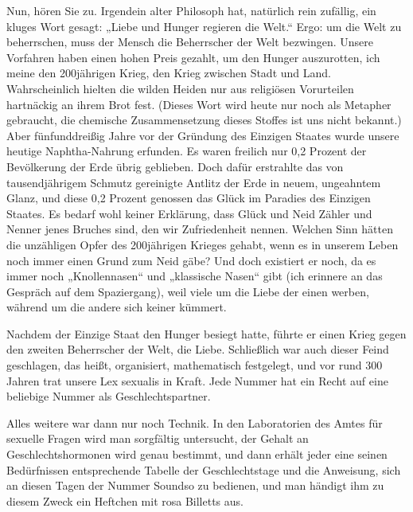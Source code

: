 Nun, hören Sie zu. Irgendein alter Philosoph hat, natürlich rein
zufällig, ein kluges Wort gesagt: „Liebe und Hunger regieren die
Welt.“ Ergo: um die Welt zu beherrschen, muss der Mensch die
Beherrscher der Welt bezwingen.
Unsere Vorfahren haben einen hohen Preis gezahlt, um den
Hunger auszurotten, ich meine den 200jährigen Krieg, den Krieg
zwischen Stadt und Land. Wahrscheinlich hielten die wilden Heiden
nur aus religiösen Vorurteilen hartnäckig an ihrem Brot fest.
(Dieses Wort wird heute nur noch als Metapher gebraucht, die
chemische Zusammensetzung dieses Stoffes ist uns nicht bekannt.)
Aber fünfunddreißig Jahre vor der Gründung des Einzigen Staates
wurde unsere heutige Naphtha-Nahrung erfunden. Es waren freilich
nur 0,2 Prozent der Bevölkerung der Erde übrig geblieben. Doch
dafür erstrahlte das von tausendjährigem Schmutz gereinigte Antlitz
der Erde in neuem, ungeahntem Glanz, und diese 0,2 Prozent genossen
das Glück im Paradies des Einzigen Staates. Es bedarf wohl keiner
Erklärung, dass Glück und Neid Zähler und Nenner jenes Bruches
sind, den wir Zufriedenheit nennen. Welchen Sinn hätten die
unzähligen Opfer des 200jährigen Krieges gehabt, wenn es in unserem
Leben noch immer einen Grund zum Neid gäbe? Und doch existiert er
noch, da es immer noch „Knollennasen“ und „klassische Nasen“ gibt
(ich erinnere an das Gespräch auf dem Spaziergang), weil viele um
die Liebe der einen werben, während um die andere sich keiner
kümmert.

Nachdem der Einzige Staat den Hunger besiegt hatte, führte er einen
Krieg gegen den zweiten Beherrscher der Welt, die Liebe.
Schließlich war auch dieser Feind geschlagen, das heißt,
organisiert, mathematisch festgelegt, und vor rund 300 Jahren trat
unsere Lex sexualis in Kraft. Jede Nummer hat ein Recht auf eine
beliebige Nummer als Geschlechtspartner.

Alles weitere war dann nur noch Technik. In den Laboratorien des
Amtes für sexuelle Fragen wird man sorgfältig
untersucht, der Gehalt an Geschlechtshormonen wird genau bestimmt,
und dann erhält jeder eine seinen Bedürfnissen entsprechende
Tabelle der Geschlechtstage und die Anweisung, sich an diesen Tagen
der Nummer Soundso zu bedienen, und man händigt ihm zu diesem Zweck
ein Heftchen mit rosa Billetts aus.

